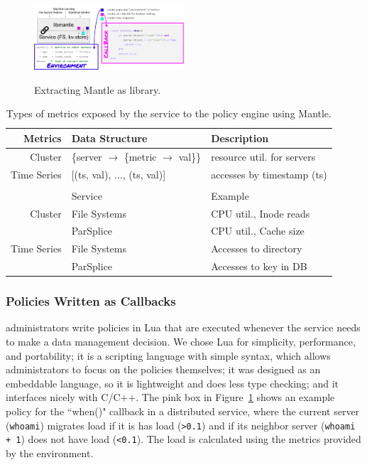 \begin{figure}[t]
  \noindent\includegraphics[width=0.5\textwidth]{figures/mantle.png}\\

  \caption{Extracting Mantle as library.\label{fig:mantle}}

\end{figure}

\begin{table}
  \centering
  \begin{tabular}{ r | l | l }
  Metrics     & Data Structure & Description \\\hline
  Cluster     & \{server \(\rightarrow\) \{metric \(\rightarrow\) val\}\}
              & resource util. for servers \\
  Time Series & [(ts, val), ..., (ts, val)]
              & accesses by timestamp (ts) \\
  && \\
              & Service      & Example \\\hline
  Cluster     & File Systems & CPU util., Inode reads \\
              & ParSplice    & CPU util., Cache size \\
  Time Series & File Systems & Accesses to directory \\
              & ParSplice    & Accesses to key in DB\\
  \end{tabular}
  \caption{Types of metrics exposed by the service to the policy engine using Mantle.\label{table:metrics}}
\end{table}

\subsubsection{Policies Written as Callbacks} administrators write policies in
Lua that are executed whenever the service needs to make a data management
decision. We chose Lua for simplicity, performance, and portability; it is a
scripting language with simple syntax, which allows administrators to focus on
the policies themselves; it was designed as an embeddable language, so it is
lightweight and does less type checking; and it interfaces nicely with C/C++.
The pink box in Figure~\ref{fig:mantle} shows an example policy for the
``when()" callback in a distributed service, where the current server
(\texttt{whoami}) migrates load if it is has load (\texttt{>0.1}) and if its
neighbor server (\texttt{whoami + 1}) does not have load (\texttt{<0.1}). The
load is calculated using the metrics provided by the environment.

